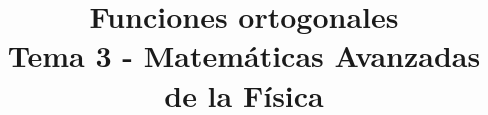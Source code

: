 
\usepackage[flushleft]{threeparttable}
\author{}
\title{Funciones ortogonales \\ {\large Tema 3 - Matemáticas Avanzadas de la Física}\vspace{-3ex}}
\date{ }

\renewcommand\labelenumii{\theenumi.{\arabic{enumii}}}
\maketitle
\fontsize{14}{14}\selectfont
